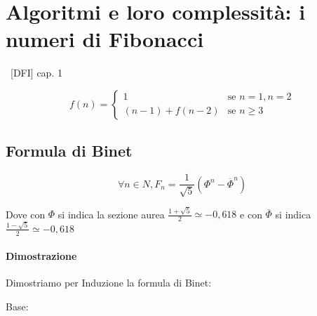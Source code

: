 \chapter{Algoritmi e loro complessità: i numeri di Fibonacci}

{~{[}DFI{]} cap. 1}

\begin{equation}
f(n) = 
\begin{cases}
1 & \mbox{se } n=1,n=2 \\ 
(n-1)+f(n-2) & \mbox{se } n\geq3 
\end{cases}
\end{equation}

\section{Formula di Binet}

\begin{equation}
\forall n \in N, F_n = \frac{1}{\sqrt{5}}(\Phi^n-\overline{\Phi}^n)
\end{equation}

Dove con $\Phi$ si indica la sezione aurea $\frac{1+\sqrt{5}}{2} \simeq -0,618$ e con $\overline{\Phi}$ si indica $\frac{1-\sqrt{5}}{2} \simeq -0,618$

\subsubsection{Dimostrazione}

{Dimostriamo per Induzione la formula di Binet:}

{Base:}

